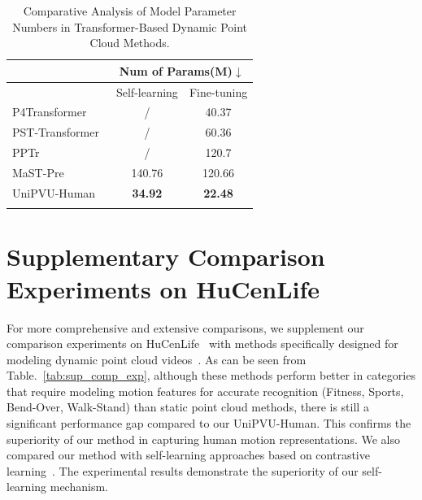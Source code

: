 \begin{appendix}
\begin{table}[ht]
\centering
\caption{Comparative Analysis of Model Parameter Numbers in Transformer-Based Dynamic Point Cloud Methods.}
\begin{tabular}{l|cc}
\Xhline{1px}
                                                          & \multicolumn{2}{c}{Num of Params(M)$\downarrow$}            \\ \hline
                                                          & \multicolumn{1}{c|}{Self-learning} & Fine-tuning \\ \hline
P4Transformer~\cite{fan2021point}   & \multicolumn{1}{c|}{/}             & 40.37       \\ \hline
PST-Transformer~\cite{fan2022point} & \multicolumn{1}{c|}{/}             & 60.36       \\ \hline
PPTr~\cite{wen2022point}            & \multicolumn{1}{c|}{/}             & 120.7       \\ \hline
MaST-Pre~\cite{shen2023masked}      & \multicolumn{1}{c|}{140.76}        & 120.66      \\ \hline
UniPVU-Human                                              & \multicolumn{1}{c|}{\textbf{34.92}}         & \textbf{22.48}       \\ \Xhline{1px}
\end{tabular}
\label{tab:model_size}
\end{table}


\section{Supplementary Comparison Experiments on HuCenLife~\cite{xu2023human}}
For more comprehensive and extensive comparisons, we supplement our comparison experiments on HuCenLife~\cite{xu2023human} with methods specifically designed for modeling dynamic point cloud videos~\cite{fan2022pstnet,fan2021point,fan2022point,wen2022point,fan2021deep}. As can be seen from Table.~\ref{tab:sup_comp_exp}, although these methods perform better in categories that require modeling motion features for accurate recognition (Fitness, Sports, Bend-Over, Walk-Stand) than static point cloud methods, there is still a significant performance gap compared to our UniPVU-Human. This confirms the superiority of our method in capturing human motion representations. We also compared our method with self-learning approaches based on contrastive learning~\cite{shen2023pointcmp}. The experimental results demonstrate the superiority of our self-learning mechanism.



\end{appendix}
